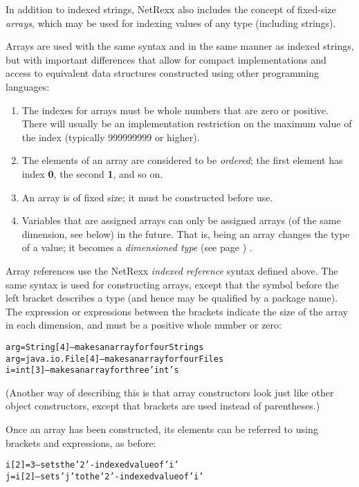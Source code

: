 In addition to indexed strings, NetRexx also includes the concept of
fixed-size \emph{arrays}, which may be used for indexing values of any
type (including strings).
 
Arrays are used with the same syntax and in the same manner as
indexed strings, but with important differences that allow for
compact implementations and access to equivalent data structures
constructed using other programming languages:
\begin{enumerate}
\item 
The indexes for arrays must be whole numbers that are zero or positive.
There will usually be an implementation restriction on the maximum value
of the index (typically 999999999 or higher).
\item 
The elements of an array are considered to be \emph{ordered}; the
first element has index \textbf{0}, the second \textbf{1}, and so on.
\item 
An array is of fixed size;
it must be constructed before use.
\item 
Variables that are assigned arrays can only be assigned arrays (of the
same dimension, see below) in the future.  That is, being an array
changes the type of a value; it becomes a
 \emph{dimensioned type} (see page \pageref{refdimtype}) .
\end{enumerate}
 
Array references use the NetRexx \emph{indexed reference} syntax
defined above.  The same syntax is used for constructing arrays, except
that the symbol before the left bracket describes a type (and hence may
be qualified by a package name).  The expression or expressions between
the brackets indicate the size of the array in each dimension, and must
be a positive whole number or zero:
\begin{alltt}
arg=String[4]       -- makes an array for four Strings
arg=java.io.File[4] -- makes an array for four Files
i=int[3]            -- makes an array for three 'int's
\end{alltt}

(Another way of describing this is that array constructors look
just like other object constructors, except that brackets are
used instead of parentheses.)
 
Once an array has been constructed, its elements can be referred to
using brackets and expressions, as before:
\begin{alltt}
i[2]=3 -- sets the '2'-indexed value of 'i'
j=i[2] -- sets 'j' to the '2'-indexed value of 'i'
\end{alltt}
 
